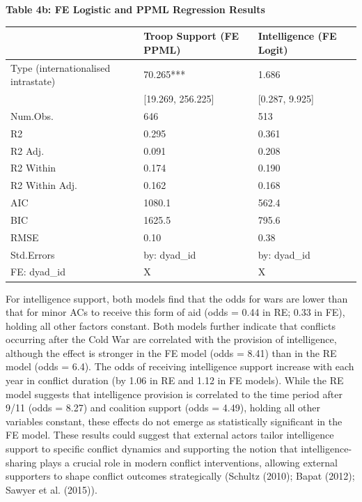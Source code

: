 \documentclass[
]{article}
\begin{document}
\noindent\textbf{Table 4b: FE Logistic and PPML Regression Results}

\begin{tabular}{lll}
\hline
& Troop Support (FE PPML) & Intelligence (FE Logit) \\ \hline
Type (internationalised intrastate) & \num{70.265}*** & \num{1.686} \\
& [\num{19.269}, \num{256.225}] & [\num{0.287}, \num{9.925}] \\
Num.Obs. & \num{646} & \num{513} \\
R2 & \num{0.295} & \num{0.361} \\
R2 Adj. & \num{0.091} & \num{0.208} \\
R2 Within & \num{0.174} & \num{0.190} \\
R2 Within Adj. & \num{0.162} & \num{0.168} \\
AIC & \num{1080.1} & \num{562.4} \\
BIC & \num{1625.5} & \num{795.6} \\
RMSE & \num{0.10} & \num{0.38} \\
Std.Errors & by: dyad\_id & by: dyad\_id \\
FE: dyad\_id & X & X \\
\hline
\end{tabular}

For intelligence support, both models find that the odds for wars are
lower than that for minor ACs to receive this form of aid (odds = 0.44
in RE; 0.33 in FE), holding all other factors constant. Both models
further indicate that conflicts occurring after the Cold War are
correlated with the provision of intelligence, although the effect is
stronger in the FE model (odds = 8.41) than in the RE model (odds =
6.4). The odds of receiving intelligence support increase with each year
in conflict duration (by 1.06 in RE and 1.12 in FE models). While the RE
model suggests that intelligence provision is correlated to the time
period after 9/11 (odds = 8.27) and coalition support (odds = 4.49),
holding all other variables constant, these effects do not emerge as
statistically significant in the FE model. These results could suggest
that external actors tailor intelligence support to specific conflict
dynamics and supporting the notion that intelligence-sharing plays a
crucial role in modern conflict interventions, allowing external
supporters to shape conflict outcomes strategically (Schultz (2010);
Bapat (2012); Sawyer et al. (2015)).
\end{document}

